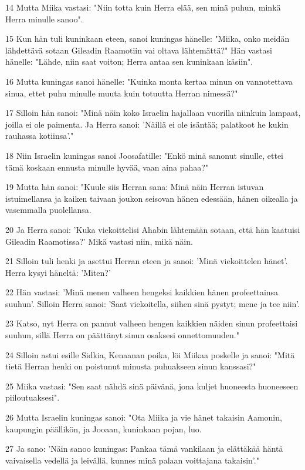 \par 14 Mutta Miika vastasi: "Niin totta kuin Herra elää, sen minä puhun, minkä Herra minulle sanoo".
\par 15 Kun hän tuli kuninkaan eteen, sanoi kuningas hänelle: "Miika, onko meidän lähdettävä sotaan Gileadin Raamotiin vai oltava lähtemättä?" Hän vastasi hänelle: "Lähde, niin saat voiton; Herra antaa sen kuninkaan käsiin".
\par 16 Mutta kuningas sanoi hänelle: "Kuinka monta kertaa minun on vannotettava sinua, ettet puhu minulle muuta kuin totuutta Herran nimessä?"
\par 17 Silloin hän sanoi: "Minä näin koko Israelin hajallaan vuorilla niinkuin lampaat, joilla ei ole paimenta. Ja Herra sanoi: 'Näillä ei ole isäntää; palatkoot he kukin rauhassa kotiinsa'."
\par 18 Niin Israelin kuningas sanoi Joosafatille: "Enkö minä sanonut sinulle, ettei tämä koskaan ennusta minulle hyvää, vaan aina pahaa?"
\par 19 Mutta hän sanoi: "Kuule siis Herran sana: Minä näin Herran istuvan istuimellansa ja kaiken taivaan joukon seisovan hänen edessään, hänen oikealla ja vasemmalla puolellansa.
\par 20 Ja Herra sanoi: 'Kuka viekoittelisi Ahabin lähtemään sotaan, että hän kaatuisi Gileadin Raamotissa?' Mikä vastasi niin, mikä näin.
\par 21 Silloin tuli henki ja asettui Herran eteen ja sanoi: 'Minä viekoittelen hänet'. Herra kysyi häneltä: 'Miten?'
\par 22 Hän vastasi: 'Minä menen valheen hengeksi kaikkien hänen profeettainsa suuhun'. Silloin Herra sanoi: 'Saat viekoitella, siihen sinä pystyt; mene ja tee niin'.
\par 23 Katso, nyt Herra on pannut valheen hengen kaikkien näiden sinun profeettaisi suuhun, sillä Herra on päättänyt sinun osaksesi onnettomuuden."
\par 24 Silloin astui esille Sidkia, Kenaanan poika, löi Miikaa poskelle ja sanoi: "Mitä tietä Herran henki on poistunut minusta puhuakseen sinun kanssasi?"
\par 25 Miika vastasi: "Sen saat nähdä sinä päivänä, jona kuljet huoneesta huoneeseen piiloutuaksesi".
\par 26 Mutta Israelin kuningas sanoi: "Ota Miika ja vie hänet takaisin Aamonin, kaupungin päällikön, ja Jooaan, kuninkaan pojan, luo.
\par 27 Ja sano: 'Näin sanoo kuningas: Pankaa tämä vankilaan ja elättäkää häntä vaivaisella vedellä ja leivällä, kunnes minä palaan voittajana takaisin'."
